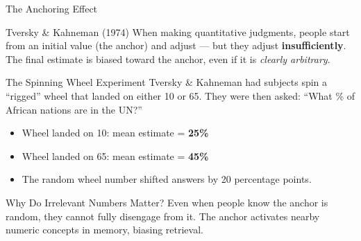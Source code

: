 \documentclass[aspectratio=169]{beamer}
\begin{document}
\begin{frame}{The Anchoring Effect}
\begin{block}{Tversky \& Kahneman (1974)}
When making quantitative judgments, people start from an initial value (the \alert{anchor}) and adjust --- but they adjust \textbf{insufficiently}. The final estimate is biased toward the anchor, even if it is \textit{clearly arbitrary}.
\end{block}
\begin{exampleblock}{The Spinning Wheel Experiment}
Tversky \& Kahneman had subjects spin a ``rigged'' wheel that landed on either 10 or 65. They were then asked: ``What \% of African nations are in the UN?''
\begin{itemize}
  \item Wheel landed on 10: mean estimate = \textbf{25\%}
  \item Wheel landed on 65: mean estimate = \textbf{45\%}
  \item The random wheel number shifted answers by \alert{20 percentage points}.
\end{itemize}
\end{exampleblock}
\begin{alertblock}{Why Do Irrelevant Numbers Matter?}
Even when people know the anchor is random, they cannot fully disengage from it. The anchor activates nearby numeric concepts in memory, biasing retrieval.
\end{alertblock}
\end{frame}
\end{document}
